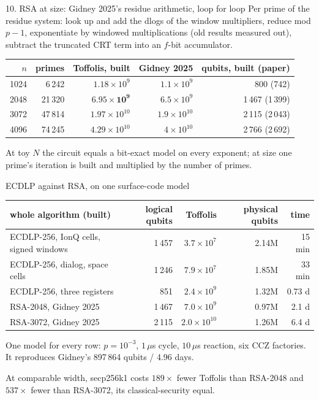 \documentclass[aspectratio=169,11pt]{beamer}
\begin{document}
\setcounter{framenumber}{203}
\begin{frame}{10. RSA at size: Gidney 2025's residue arithmetic, loop for loop}
  Per prime of the residue system: look up and add the dlogs of the window multipliers, reduce mod $p-1$, exponentiate by windowed multiplications (old results measured out), subtract the truncated CRT term into an $f$-bit accumulator.
  \vskip2mm
  \centering\small
  \renewcommand{\arraystretch}{1.15}
  \begin{tabular}{@{}rrrrr@{}}
    \toprule
    $n$ & primes & Toffolis, built & Gidney 2025 & qubits, built (paper) \\
    \midrule
    1024 & 6\,242 & $1.18\times10^9$ & $1.1\times10^9$ & 800 (742) \\
    2048 & 21\,320 & $\mathbf{6.95\times10^9}$ & $6.5\times10^9$ & 1\,467 (1\,399) \\
    3072 & 47\,814 & $1.97\times10^{10}$ & $1.9\times10^{10}$ & 2\,115 (2\,043) \\
    4096 & 74\,245 & $4.29\times10^{10}$ & $4\times10^{10}$ & 2\,766 (2\,692) \\
    \bottomrule
  \end{tabular}
  \vskip2mm
  \raggedright{\small At toy $N$ the circuit equals a bit-exact model on every exponent; at size one prime's iteration is built and multiplied by the number of primes.}
\end{frame}

\setcounter{framenumber}{204}
\begin{frame}{ECDLP against RSA, on one surface-code model}
  \centering\small
  \renewcommand{\arraystretch}{1.15}
  \begin{tabular}{@{}lrrrr@{}}
    \toprule
    whole algorithm (built) & logical qubits & Toffolis & physical qubits & time \\
    \midrule
    ECDLP-256, IonQ cells, signed windows & 1\,457 & $3.7\times10^7$ & 2.14M & 15 min \\
    ECDLP-256, dialog, space cells & 1\,246 & $7.9\times10^7$ & 1.85M & 33 min \\
    ECDLP-256, three registers & 851 & $2.4\times10^9$ & 1.32M & 0.73 d \\
    RSA-2048, Gidney 2025 & 1\,467 & $7.0\times10^9$ & 0.97M & 2.1 d \\
    RSA-3072, Gidney 2025 & 2\,115 & $2.0\times10^{10}$ & 1.26M & 6.4 d \\
    \bottomrule
  \end{tabular}
  \vskip2mm
  \raggedright{\small One model for every row: $p=10^{-3}$, $1\,\mu$s cycle, $10\,\mu$s reaction, six CCZ factories. It reproduces Gidney's 897\,864 qubits / 4.96 days.}
  \begin{takeaway}At comparable width, secp256k1 costs $189\times$ fewer Toffolis than RSA-2048 and $537\times$ fewer than RSA-3072, its classical-security equal.\end{takeaway}
\end{frame}
\end{document}
